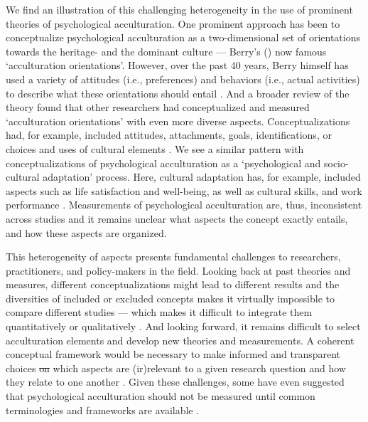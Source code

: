 \documentclass[man, 12pt, a4paper, mask]{apa7}
\providecommand{\DIFaddtex}[1]{{\protect\color{blue}\uwave{#1}}} %
\providecommand{\DIFdeltex}[1]{{\protect\color{red}\sout{#1}}}                      %
\providecommand{\DIFaddbegin}{} %
\providecommand{\DIFaddend}{} %
\providecommand{\DIFdelbegin}{} %
\providecommand{\DIFdelend}{} %
\providecommand{\DIFadd}[1]{\texorpdfstring{\DIFaddtex{#1}}{#1}} %
\providecommand{\DIFdel}[1]{\texorpdfstring{\DIFdeltex{#1}}{}} %
\newcommand{\DIFscaledelfig}{0.5}
\newlength{\DIFdelgraphicswidth} %
\newlength{\DIFdelgraphicsheight} %
\newcommand{\DIFaddincludegraphics}[2][]{{\color{blue}\fbox{\DIFOincludegraphics[#1]{#2}}}} %
\newcommand{\DIFdelincludegraphics}[2][]{%
\sbox{\DIFdelgraphicsbox}{\DIFOincludegraphics[#1]{#2}}%
\settoboxwidth{\DIFdelgraphicswidth}{\DIFdelgraphicsbox} %
\settoboxtotalheight{\DIFdelgraphicsheight}{\DIFdelgraphicsbox} %
\scalebox{\DIFscaledelfig}{%
\parbox[b]{\DIFdelgraphicswidth}{\usebox{\DIFdelgraphicsbox}\\[-\baselineskip] \rule{\DIFdelgraphicswidth}{0em}}\llap{\resizebox{\DIFdelgraphicswidth}{\DIFdelgraphicsheight}{%
\setlength{\unitlength}{\DIFdelgraphicswidth}%
\begin{picture}(1,1)%
\thicklines\linethickness{2pt} %
{\color[rgb]{1,0,0}\put(0,0){\framebox(1,1){}}}%
{\color[rgb]{1,0,0}\put(0,0){\line( 1,1){1}}}%
{\color[rgb]{1,0,0}\put(0,1){\line(1,-1){1}}}%
\end{picture}%
}\hspace*{3pt}}} %
} %
\DeclareRobustCommand{\DIFaddbegin}{\DIFOaddbegin \let\includegraphics\DIFaddincludegraphics} %
\DeclareRobustCommand{\DIFaddend}{\DIFOaddend \let\includegraphics\DIFOincludegraphics} %
\DeclareRobustCommand{\DIFdelbegin}{\DIFOdelbegin \let\includegraphics\DIFdelincludegraphics} %
\DeclareRobustCommand{\DIFdelend}{\DIFOaddend \let\includegraphics\DIFOincludegraphics} %
\begin{document}
We find an illustration of this challenging heterogeneity in the use of prominent theories of psychological acculturation. One prominent approach has been to conceptualize psychological acculturation as a two-dimensional set of orientations towards the heritage- and the dominant culture --- Berry's (\citeyear{Berry1980, Berry1997b, Berry2005}) now famous `acculturation orientations'. However, over the past 40 years, Berry himself has used a variety of attitudes (i.e., preferences) and behaviors (i.e., actual activities) to describe what these orientations should entail \citep{Berry2005}. And a broader review of the theory found that other researchers had conceptualized and measured `acculturation orientations' with even more diverse aspects. Conceptualizations had, for example, included attitudes, attachments, goals, identifications, or choices and uses of cultural elements \citep[e.g., language, food, or dresses. See,][]{Rudmin2003a}. We see a similar pattern with conceptualizations of psychological acculturation as a `psychological and socio-cultural adaptation' process. Here, cultural adaptation has, for example, included aspects such as life satisfaction and well-being, as well as cultural skills, and work performance \citep{Searle1990, Ward2001, Berry2003}.
Measurements of psychological acculturation are, thus, inconsistent across studies and it remains unclear what aspects the concept exactly entails, and how these aspects are organized.

This heterogeneity of aspects presents fundamental challenges to researchers, practitioners, and policy-makers in the field. Looking back at past theories and measures, different conceptualizations might lead to different results \citep{Snauwaert2003} and the diversities of included or excluded concepts makes it virtually impossible to compare different studies --- which makes it difficult to integrate them quantitatively or qualitatively \citep{Taft1981}.
And looking forward, it remains difficult to select acculturation elements and develop new theories and measurements. A coherent conceptual framework would be necessary to make informed and transparent choices \DIFdelbegin \DIFdel{on }\DIFdelend \DIFaddbegin \DIFadd{about }\DIFaddend which aspects are (ir)relevant to a given research question and how they relate to one another \DIFaddbegin \DIFadd{as a psychological process}\DIFaddend .
Given these challenges, some have even suggested that psychological acculturation should not be measured until common terminologies and frameworks are available \citep{Escobar2000}.
\end{document}
